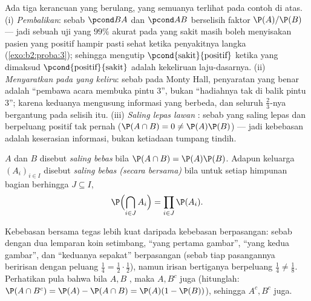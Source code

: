 \begin{remark}
Ada tiga kerancuan yang berulang, yang semuanya terlihat pada contoh
di atas. (i) \emph{Pembalikan}: sebab $\pcond BA$ dan $\pcond AB$
berselisih faktor $\P(A)/\P(B)$ --- jadi sebuah uji yang
$99\%$ akurat pada yang sakit masih boleh menyisakan pasien yang positif
hampir pasti sehat ketika penyakitnya langka
(\cref{exo:b2:proba:3}); sehingga mengutip $\pcond{\text{sakit}}{
\text{positif}}$ ketika yang dimaksud $\pcond{\text{positif}}{
\text{sakit}}$ adalah kekeliruan laju-dasarnya. (ii)
\emph{Menyaratkan pada  yang keliru}: sebab pada Monty Hall,
 penyaratan yang benar adalah ``pembawa acara membuka pintu $3$'',
bukan ``hadiahnya tak di balik pintu $3$''; karena keduanya mengusung
informasi yang berbeda, dan seluruh $\frac23$-nya bergantung pada
selisih itu. (iii) \emph{Saling lepas lawan }:
sebab  yang saling lepas dan berpeluang positif tak pernah
 ($\P(A\cap B) = 0 \neq \P(A)\P(B)$) ---
jadi kebebasan adalah keserasian informasi, bukan ketiadaan
tumpang tindih.
\end{remark}

\begin{definition}[Kebebasan]\label{def:b2:proba:independence}
 $A$ dan $B$ disebut \emph{saling bebas} bila $\P(A \cap B) =
\P(A)\P(B)$. Adapun keluarga  $(A_i)_{i \in I}$ disebut
\emph{saling bebas (secara bersama)} bila untuk setiap himpunan bagian berhingga $J
\subseteq I$,
\[
\P\Bigl(\bigcap_{i \in J} A_i\Bigr)
= \prod_{i \in J} \P(A_i) .
\]
\end{definition}

\begin{remark}
Kebebasan bersama tegas lebih kuat daripada kebebasan
berpasangan: sebab dengan dua lemparan koin setimbang,  ``yang pertama
gambar'', ``yang kedua gambar'', dan ``keduanya sepakat'' 
berpasangan (sebab tiap pasangannya beririsan dengan peluang $\frac14 =
\frac12\cdot\frac12$), namun irisan bertiganya berpeluang
$\frac14 \neq \frac18$. Perhatikan pula bahwa bila $A, B$ ,
maka $A, B^c$ juga (hitunglah: $\P(A \cap B^c) = \P(A) - \P(A\cap B) =
\P(A)(1 - \P(B))$), sehingga $A^c, B^c$ juga.
\end{remark}

